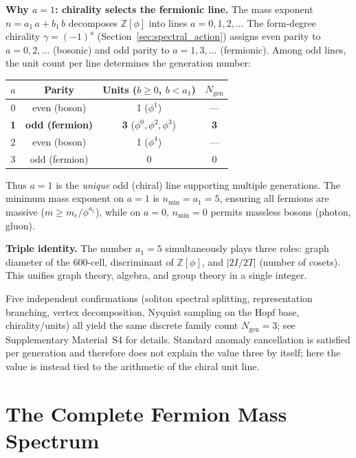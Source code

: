 \documentclass[12pt,a4paper]{article}
\theoremstyle{definition}
\begin{document}
\textbf{Why $a = 1$: chirality selects the fermionic line.}  The mass exponent $n = a_1\,a + b_1\,b$ decomposes $\mathbb{Z}[\phi]$ into lines $a = 0, 1, 2, \ldots$  The form-degree chirality $\gamma = (-1)^a$ (Section~\ref{sec:spectral_action}) assigns even parity to $a = 0, 2, \ldots$ (bosonic) and odd parity to $a = 1, 3, \ldots$ (fermionic).  Among odd lines, the unit count per line determines the generation number:
\begin{center}
\begin{tabular}{cccc}
\toprule
$a$ & Parity & Units ($b \geq 0$, $b < a_1$) & $N_{\text{gen}}$ \\
\midrule
0 & even (boson) & 1 ($\phi^1$) & --- \\
\textbf{1} & \textbf{odd (fermion)} & \textbf{3} ($\phi^0, \phi^2, \phi^3$) & \textbf{3} \\
2 & even (boson) & 1 ($\phi^4$) & --- \\
3 & odd (fermion) & 0 & 0 \\
\bottomrule
\end{tabular}
\end{center}
Thus $a = 1$ is the \emph{unique} odd (chiral) line supporting multiple generations.  The minimum mass exponent on $a = 1$ is $n_{\min} = a_1 = 5$, ensuring all fermions are massive ($m \geq m_e/\phi^{a_1}$), while on $a = 0$, $n_{\min} = 0$ permits massless bosons (photon, gluon).

\textbf{Triple identity.} The number $a_1 = 5$ simultaneously plays three roles: graph diameter of the 600-cell, discriminant of $\mathbb{Z}[\phi]$, and $|2I/2T|$ (number of cosets). This unifies graph theory, algebra, and group theory in a single integer.

Five independent confirmations (soliton spectral splitting, representation branching, vertex decomposition, Nyquist sampling on the Hopf base, chirality/units) all yield the same discrete family count $N_{\text{gen}} = 3$; see Supplementary Material~S4 for details.  Standard anomaly cancellation is satisfied per generation and therefore does not explain the value three by itself; here the value is instead tied to the arithmetic of the chiral unit line.



\section{The Complete Fermion Mass Spectrum}
\label{sec:masses}
\end{document}
